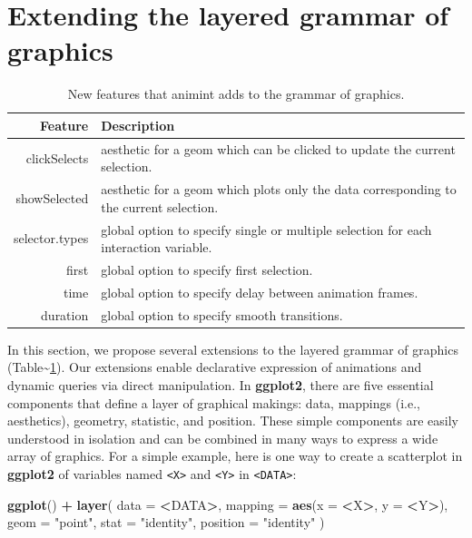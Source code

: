 \documentclass[12pt,]{article}
\newenvironment{Shaded}{\begin{snugshade}}{\end{snugshade}}
\newcommand{\DataTypeTok}[1]{\textcolor[rgb]{0.13,0.29,0.53}{#1}}
\newcommand{\KeywordTok}[1]{\textcolor[rgb]{0.13,0.29,0.53}{\textbf{#1}}}
\newcommand{\NormalTok}[1]{#1}
\newcommand{\OperatorTok}[1]{\textcolor[rgb]{0.81,0.36,0.00}{\textbf{#1}}}
\newcommand{\StringTok}[1]{\textcolor[rgb]{0.31,0.60,0.02}{#1}}
\theoremstyle{definition}
\theoremstyle{definition}
\theoremstyle{definition}
\theoremstyle{remark}
\begin{document}
\hypertarget{extending-the-layered-grammar-of-graphics}{%
\section{Extending the layered grammar of
graphics}\label{extending-the-layered-grammar-of-graphics}}

\begin{table}

\caption{
New features that animint adds to the grammar of graphics.
}\label{tab:overview}
\small
\begin{tabularx}{\textwidth}{rl}
Feature & Description \\
\hline
clickSelects & aesthetic for a geom which can be clicked to update the current selection.  \\
showSelected & aesthetic for a geom which plots only the data corresponding to the current selection.  \\
selector.types & global option to specify single or multiple selection for each interaction variable.  \\
first & global option to specify first selection.  \\
time & global option to specify delay between animation frames.  \\
duration & global option to specify smooth transitions.  \\
\hline
\end{tabularx}

\end{table}

In this section, we propose several extensions to the layered grammar of
graphics (Table\textasciitilde{}\ref{tab:overview}). Our extensions
enable declarative expression of animations and dynamic queries via
direct manipulation. In \textbf{ggplot2}, there are five essential
components that define a layer of graphical makings: data, mappings
(i.e., aesthetics), geometry, statistic, and position. These simple
components are easily understood in isolation and can be combined in
many ways to express a wide array of graphics. For a simple example,
here is one way to create a scatterplot in \textbf{ggplot2} of variables
named \texttt{\textless{}X\textgreater{}} and
\texttt{\textless{}Y\textgreater{}} in
\texttt{\textless{}DATA\textgreater{}}:

\begin{Shaded}
\begin{Highlighting}[]
\KeywordTok{ggplot}\NormalTok{() }\OperatorTok{+}\StringTok{ }\KeywordTok{layer}\NormalTok{(}
  \DataTypeTok{data =} \OperatorTok{<}\NormalTok{DATA}\OperatorTok{>}\NormalTok{, }
  \DataTypeTok{mapping =} \KeywordTok{aes}\NormalTok{(}\DataTypeTok{x =} \OperatorTok{<}\NormalTok{X}\OperatorTok{>}\NormalTok{, }\DataTypeTok{y =} \OperatorTok{<}\NormalTok{Y}\OperatorTok{>}\NormalTok{), }
  \DataTypeTok{geom =} \StringTok{"point"}\NormalTok{, }
  \DataTypeTok{stat =} \StringTok{"identity"}\NormalTok{,}
  \DataTypeTok{position =} \StringTok{"identity"}
\NormalTok{)}
\end{Highlighting}
\end{Shaded}
\end{document}
